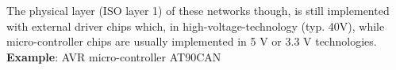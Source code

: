 The physical layer (ISO layer 1) of these networks though, is still implemented with external driver chips which, in high-voltage-technology (typ. 40V), while micro-controller chips are usually implemented in 5 V or 3.3 V technologies.\\

\textbf{Example}: AVR micro-controller AT90CAN

    
